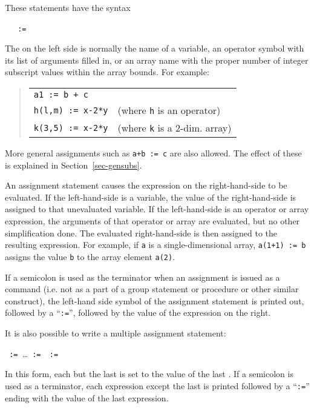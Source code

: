 \label{reserved:assignop}

These statements
 have the syntax
\begin{syntax}
  \ \BNFprod\ \texttt{ := }
\end{syntax}
The  on the left side is normally the name of a variable, an
operator symbol with its list of arguments filled in, or an array name with
the proper number of integer subscript values within the array bounds. For
example:
\begin{quote}
\begin{tabular}{ll}
\texttt{a1 := b + c} \\
\texttt{h(l,m) := x-2*y} \hspace{1cm} & (where \texttt{h} is an operator) \\
\texttt{k(3,5) := x-2*y}              & (where \texttt{k} is a 2-dim. array)
\end{tabular}
\end{quote}
More general assignments such as \texttt{a+b := c} are also
allowed.  The effect of these is explained in Section~\ref{sec-gensubs}.

An assignment statement causes the expression on the right-hand-side to be
evaluated.  If the left-hand-side is a variable, the value of the
right-hand-side is assigned to that unevaluated variable.  If the
left-hand-side is an operator or array expression, the arguments of that
operator or array are evaluated, but no other simplification done.  The
evaluated right-hand-side is then assigned to the resulting expression.
For example, if \texttt{a} is a single-dimensional array, \texttt{a(1+1) := b}
assigns the value \texttt{b} to the array element \texttt{a(2)}.

If a semicolon is used as the terminator when an assignment
 is issued as a command (i.e. not as a part of a group
statement or procedure or other similar construct), the left-hand side
symbol of the assignment statement is printed out, followed by a
``\texttt{:=}'', followed by the value of the expression on the right.

It is also possible to write a multiple assignment statement:
\begin{syntax}
  \texttt{ := }\dots\texttt{ :=
  }\texttt{ := }
\end{syntax}
In this form, each  but the last is set to the value of
the last .  If a semicolon is used as a terminator, each
expression except the last is printed followed by a ``\texttt{:=}'' ending
with the value of the last expression.


